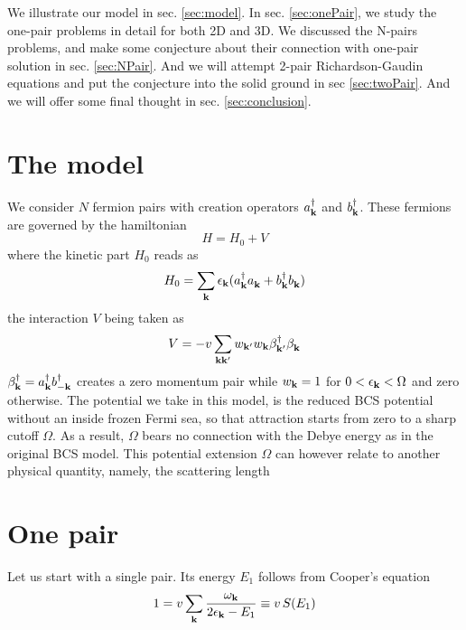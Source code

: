 \documentclass[aps,prb,showpacs,3p,twocolumn]{elsarticle}
\begin{document}
We illustrate our model in sec. \ref{sec:model}.  In sec. \ref{sec:onePair}, we study the one-pair problems in detail for both 2D and 3D.  We discussed the N-pairs problems, and make some conjecture about their connection with one-pair solution  in sec. \ref{sec:NPair}.  And we will attempt 2-pair Richardson-Gaudin equations and put the conjecture into the solid ground in sec \ref{sec:twoPair}.  And we will offer some final thought in sec. \ref{sec:conclusion}.
\section{The model\label{sec:model}}
We consider $N$ fermion pairs with creation operators $a_{\mathbf{k}}^\dagger$ and $b_{\mathbf{k}}^\dagger$.  These fermions are  governed by the hamiltonian
\begin{equation}
H=H_{0}+V
\end{equation}
where  the kinetic part $H_0$ reads as 
\begin{equation}
H_0=\sum_{\mathbf{k}}\epsilon_{\mathbf{k}}(a^\dagger_{\mathbf{k}}{}a^{}_{\mathbf{k}}+b^\dagger_{\mathbf{k}}{}b^{}_{\mathbf{k}})
\label{eq:}
\end{equation}
the interaction $V$ being taken as 
\begin{equation}
V=-v\sum_{\mathbf{k}\mathbf{k}'}w_{\mathbf{k}'}w_{\mathbf{k}}\beta^\dagger_{\mathbf{k}'}{}\beta^{}_{\mathbf{k}}
\label{eq:VBcs}
\end{equation}
 $\beta^\dagger_{\mathbf{k}}=a^\dagger_{\mathbf{k}}b^\dagger_{-\mathbf{k}}$ creates a zero momentum pair while $w_{\mathbf{k}}=1$ for $0<\epsilon_{\mathbf{k}}<\Omega$ and zero otherwise.  The potential we take in this model, is the reduced BCS  potential without an inside frozen Fermi sea, so that attraction starts from zero to a sharp cutoff $\Omega$.  As a result,  $\Omega$ bears no connection with the Debye energy as in the original BCS model. This potential extension $\Omega$ can however relate to another physical quantity, namely, the scattering length %
\section{One pair\label{sec:onePair}}
Let us start with a single pair. Its energy $E_1$ follows from Cooper's equation
\begin{equation}
1=v\sum_{\mathbf{k}}\frac{\omega_{\mathbf{k}}}{2\epsilon_{\mathbf{k}}-E_1}\equiv{}v\,S(E_1)
\label{eq:onePair}
\end{equation}
\end{document}
